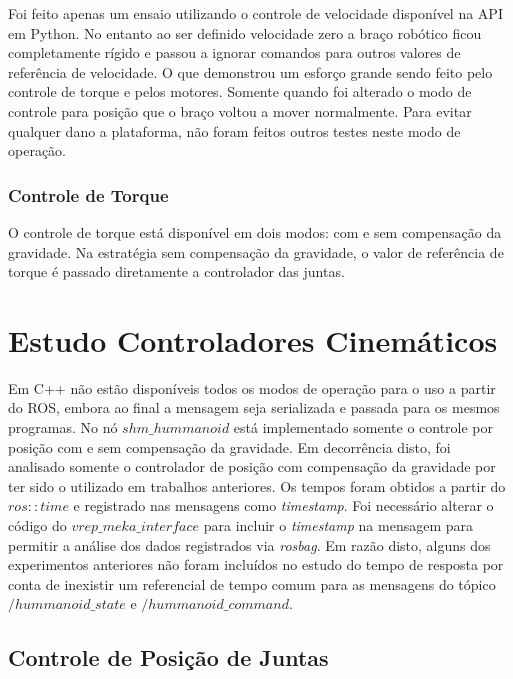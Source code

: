 Foi feito apenas um ensaio utilizando o controle de velocidade disponível na API em Python. No entanto ao ser definido velocidade zero a braço robótico ficou completamente rígido e passou a ignorar comandos para outros valores de referência de velocidade. O que demonstrou um esforço grande sendo feito pelo controle de torque e pelos motores. Somente quando foi alterado o modo de controle para posição que o braço voltou a mover normalmente. Para evitar qualquer dano a plataforma, não foram feitos outros testes neste modo de operação.


\subsubsection{Controle de Torque}

O controle de torque está disponível em dois modos: com e sem compensação da gravidade. Na estratégia sem compensação da gravidade, o valor de referência de torque é passado diretamente a controlador das juntas.


\section{Estudo Controladores Cinemáticos}

Em C++ não estão disponíveis todos os modos de operação para o uso a partir do ROS, embora ao final a mensagem seja serializada e passada para os mesmos programas. No nó $shm\_hummanoid$ está implementado somente o controle por posição com e sem compensação da gravidade. Em decorrência disto, foi analisado somente o controlador de posição com compensação da gravidade por ter sido o utilizado em trabalhos anteriores. Os tempos foram obtidos a partir do $ros::time$ e registrado nas mensagens como \textit{timestamp}. Foi necessário alterar o código do $vrep\_meka\_interface$ para incluir o \textit{timestamp} na mensagem para permitir a análise dos dados registrados via \textit{rosbag}. Em razão disto, alguns dos experimentos anteriores não foram incluídos no estudo do tempo de resposta por conta de inexistir um referencial de tempo comum para as mensagens do tópico $/hummanoid\_state$ e $/hummanoid\_command$.

\subsection{Controle de Posição de Juntas}\label{subsec:stepcpp}

